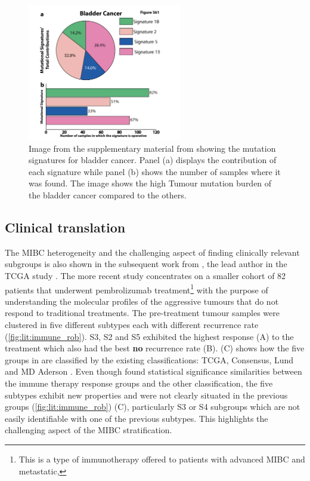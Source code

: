 \begin{figure}[!htb]    
    \centering
    \includegraphics[width=0.6\textwidth,height=0.6\textheight,keepaspectratio]{Sections/Lit_review/Resources/bladder_mut_sig.png}
    \caption[Bladder mutational signature]{Image from the supplementary material from \citeauthor{Alexandrov2013-gi} showing the mutation signatures for bladder cancer. Panel (a) displays the contribution of each signature while panel (b) shows the number of samples where it was found. The image shows the high Tumour mutation burden of the bladder cancer compared to the others.}
    \label{fig:lit:bladder_mut_sig}
\end{figure}



\subsection{Clinical translation} \label{s:lit:clinical}


The MIBC heterogeneity and the challenging aspect of finding clinically relevant subgroups is also shown in the subsequent work from \citeauthor{Robertson2023-na}, the lead author in the TCGA study \citet{Robertson2017-mg}. The more recent study concentrates on a smaller cohort of 82 patients that underwent pembrolizumab treatment\footnote{This is a type of immunotherapy offered to patients with advanced MIBC and metastatic,} with the purpose of understanding the molecular profiles of the aggressive tumours that do not respond to traditional treatments. The pre-treatment tumour samples were clustered in five different subtypes each with different recurrence rate (\cref{fig:lit:immune_rob}). S3, S2 and S5 exhibited the highest response (A) to the treatment which also had the best \textbf{no} recurrence rate (B).  (C) shows how the five groups in \cite{Robertson2023-na} are classified by the existing classifications: TCGA, Consensus, Lund and MD Aderson \citep{Robertson2017-mg,Kamoun2020-tj,Marzouka2018-ge,Dadhania2016-cb}. Even though \citeauthor{Robertson2023-na} found statistical significance similarities between the immune therapy response groups and the other classification, the five subtypes exhibit new properties and were not clearly situated in the previous groups (\cref{fig:lit:immune_rob}) (C), particularly S3 or S4 subgroups which are not easily identifiable with one of the previous subtypes. This highlights the challenging aspect of the MIBC stratification.


